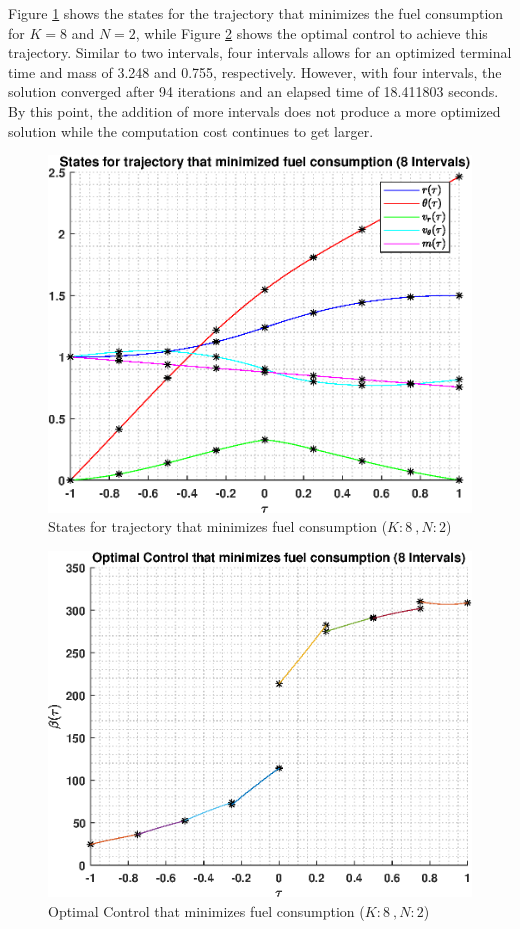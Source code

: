 \documentclass[]{article}
\begin{document}
Figure \ref{fig:directStatesK8Poly2} shows the states for the trajectory that minimizes the fuel consumption for \(K = 8\) and  \(N = 2\), while Figure \ref{fig:directControlK8Poly2} shows the optimal control to achieve this trajectory. Similar to two intervals, four intervals allows for an optimized terminal time and mass of 3.248 and 0.755, respectively. However, with four intervals, the solution converged after 94 iterations and an elapsed time of 18.411803 seconds. By this point, the addition of more intervals does not produce a more optimized solution while the computation cost continues to get larger.

\begin{figure}
	\centering
	\includegraphics[scale=0.75]{directStatesK8Poly2.eps}
	\caption{States for trajectory that minimizes fuel consumption (\(K:8\ , N:2\))}
	\label{fig:directStatesK8Poly2}
\end{figure}
\begin{figure}
	\centering
	\includegraphics[scale=0.75]{directControlK8Poly2.eps}
	\caption{Optimal Control that minimizes fuel consumption (\(K:8\ , N:2\))}
	\label{fig:directControlK8Poly2}
\end{figure}
\FloatBarrier
\end{document}
